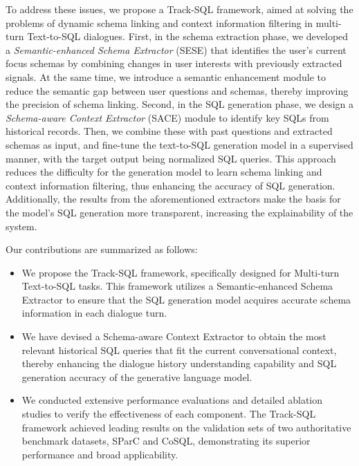 \documentclass[11pt]{article}
\begin{document}
To address these issues, we propose a Track-SQL framework, aimed at solving the problems of dynamic schema linking and context information filtering in multi-turn Text-to-SQL dialogues. First, in the schema extraction phase, we developed a \emph{Semantic-enhanced Schema Extractor} (SESE) that identifies the user's current focus schemas by combining changes in user interests with previously extracted signals. At the same time, we introduce a semantic enhancement module to reduce the semantic gap between user questions and schemas, thereby improving the precision of schema linking. Second, in the SQL generation phase, we design a \emph{Schema-aware Context Extractor} (SACE) module to identify key SQLs from historical records.
Then, we combine these with past questions and extracted schemas as input, and fine-tune the text-to-SQL generation model in a supervised manner, with the target output being normalized SQL queries.
This approach reduces the difficulty for the generation model to learn schema linking and context information filtering, thus enhancing the accuracy of SQL generation. Additionally, the results from the aforementioned extractors make the basis for the model's SQL generation more transparent, increasing the explainability of the system.

Our contributions are summarized as follows:
\begin{itemize}
\item  We propose the Track-SQL framework, specifically designed for Multi-turn Text-to-SQL tasks. This framework utilizes a Semantic-enhanced Schema Extractor to ensure that the SQL generation model acquires accurate schema information in each dialogue turn.
\item We have devised a Schema-aware Context Extractor to obtain the most relevant historical SQL queries that fit the current conversational context, thereby enhancing the dialogue history understanding capability and SQL generation accuracy of the generative language model.
\item We conducted extensive performance evaluations and detailed ablation studies to verify the effectiveness of each component. The Track-SQL framework achieved leading results on the validation sets of two authoritative benchmark datasets, SParC and CoSQL, demonstrating its superior performance and broad applicability.
\end{itemize}
\end{document}
